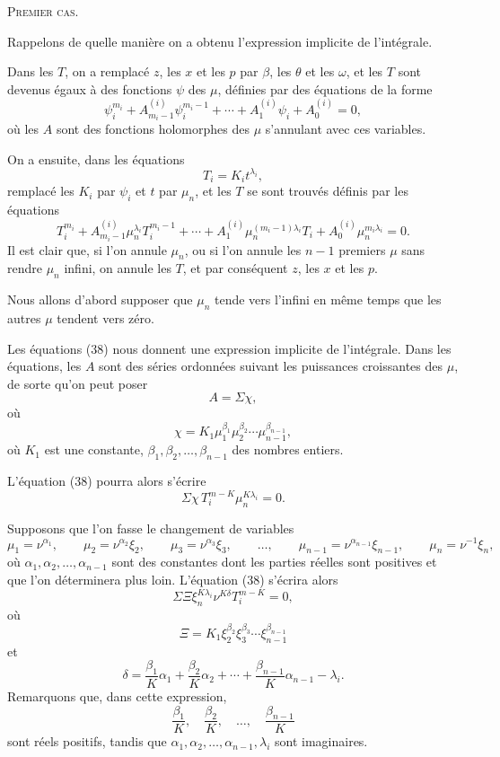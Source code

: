 \documentclass[11pt]{article}
\begin{document}
\begin{center}
{\scshape Premier cas.}
\end{center}

Rappelons de quelle manière on a obtenu l’expression implicite de l’intégrale.

Dans les $T$, on a remplacé $z$, les $x$ et les $p$ par $\beta$, les $\theta$ et les $\omega$, et les $T$ sont devenus égaux à des fonctions $\psi$ des $\mu$, définies par des équations de la forme
\[
\psi_i^{m_i}+A_{m_i-1}^{(i)}\psi_i^{m_i-1}+\cdots+A_1^{(i)}\psi_i+A_0^{(i)}=0,
\]
où les $A$ sont des fonctions holomorphes des $\mu$ s’annulant avec ces variables.

On a ensuite, dans les équations
\[
T_i=K_it^{\lambda_i},
\]
remplacé les $K_i$ par $\psi_i$ et $t$ par $\mu_n$, et les $T$ se sont trouvés définis par les équations
\begin{equation*}\tag{38}
T_i^{m_i}+A_{m_i-1}^{(i)}\mu_n^{\lambda_i}T_i^{m_i-1}+\cdots+A_1^{(i)}\mu_n^{(m_i-1)\lambda_i}T_i+A_0^{(i)}\mu_n^{m_i\lambda_i}=0.
\end{equation*}
Il est clair que, si l’on annule $\mu_n$, ou si l’on annule les $n-1$ premiers $\mu$ sans rendre $\mu_n$ infini, on annule les $T$, et par conséquent $z$, les $x$ et les $p$.

Nous allons d’abord supposer que $\mu_n$ tende vers l’infini en même temps que les autres $\mu$ tendent vers zéro.

Les équations (38) nous donnent une expression implicite de l’intégrale.
Dans les équations, les $A$ sont des séries ordonnées suivant les puissances croissantes des $\mu$, de sorte qu’on peut poser
\[
A=\Sigma\chi,
\]
où
\[
\chi=K_1\mu_1^{\beta_1}\mu_2^{\beta_2}\cdots\mu_{n-1}^{\beta_{n-1}},
\]
où $K_1$ est une constante, $\beta_1,\beta_2,\ldots,\beta_{n-1}$ des nombres entiers.

L’équation (38) pourra alors s’écrire
\[
\Sigma\chi\,T_i^{m-K}\mu_n^{K\lambda_i}=0.
\]

Supposons que l’on fasse le changement de variables
\begin{equation*}\tag{39}
\mu_1=\nu^{\alpha_1},\qquad
\mu_2=\nu^{\alpha_2}\xi_2,
\qquad
\mu_3=\nu^{\alpha_3}\xi_3,
\qquad \ldots,\qquad
\mu_{n-1}=\nu^{\alpha_{n-1}}\xi_{n-1},
\qquad
\mu_n=\nu^{-1}\xi_n,
\end{equation*}
où $\alpha_1,\alpha_2,\ldots,\alpha_{n-1}$ sont des constantes dont les parties réelles sont positives et que l’on déterminera plus loin. L’équation (38) s’écrira alors
\[
\Sigma\Xi\xi_n^{K\lambda_i}\nu^{K\delta}T_i^{m-K}=0,
\]
où
\[
\Xi=K_1\xi_2^{\beta_2}\xi_3^{\beta_3}\cdots\xi_{n-1}^{\beta_{n-1}}
\]
et
\[
\delta=\frac{\beta_1}{K}\alpha_1+\frac{\beta_2}{K}\alpha_2+\cdots+\frac{\beta_{n-1}}{K}\alpha_{n-1}-\lambda_i.
\]
Remarquons que, dans cette expression,
\[
\frac{\beta_1}{K},\quad \frac{\beta_2}{K},\quad \ldots,\quad \frac{\beta_{n-1}}{K}
\]
sont réels positifs, tandis que $\alpha_1,\alpha_2,\ldots,\alpha_{n-1},\lambda_i$ sont imaginaires.
\end{document}
